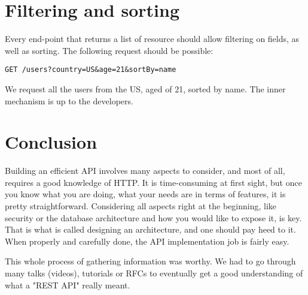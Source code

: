 \section{Filtering and sorting}

Every end-point that returns a list of resource should allow filtering on fields, as well as sorting. The following request should be possible:

\begin{lstlisting}
GET /users?country=US&age=21&sortBy=name
\end{lstlisting}
We request all the users from the US, aged of 21, sorted by name. The inner mechanism is up to the developers.

\section{Conclusion}

Building an efficient API involves many aspects to consider, and most of all, requires a good knowledge of HTTP. It is time-consuming at first sight, but once you know what you are doing, what your needs are in terms of features, it is pretty straightforward. Considering all aspects right at the beginning, like security or the database architecture and how you would like to expose it, is key. That is what is called designing an architecture, and one should pay heed to it. When properly and carefully done, the API implementation job is fairly easy.

\medskip

This whole process of gathering information was worthy. We had to go through many talks (videos), tutorials or RFCs to eventually get a good understanding of what a "REST API" really meant.